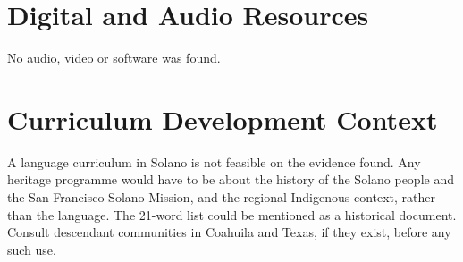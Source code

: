 \documentclass[12pt]{article}
\begin{document}
\section{Digital and Audio Resources}
No audio, video or software was found.

\section{Curriculum Development Context}
A language curriculum in Solano is not feasible on the evidence found. Any heritage programme would have to be about the history of the Solano people and the San Francisco Solano Mission, and the regional Indigenous context, rather than the language. The 21-word list could be mentioned as a historical document. Consult descendant communities in Coahuila and Texas, if they exist, before any such use.
\end{document}
